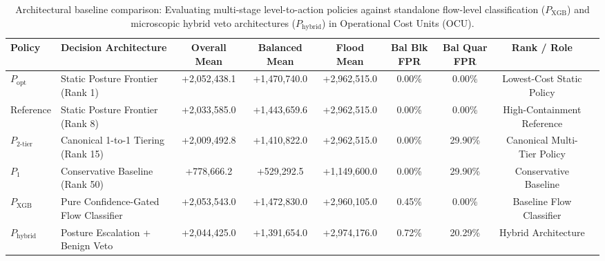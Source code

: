 \documentclass[journal,10pt,onecolumn]{IEEEtran}
\begin{document}
\begin{table}[t]
\caption{Architectural baseline comparison: Evaluating multi-stage level-to-action policies against standalone flow-level classification ($P_{\text{XGB}}$) and microscopic hybrid veto architectures ($P_{\text{hybrid}}$) in Operational Cost Units (OCU).}
\label{tab:architectural_baselines}
\centering
\small
\begin{tabular}{llccccccc}
\toprule
\textbf{Policy} & \textbf{Decision Architecture} & \textbf{Overall Mean} & \textbf{Balanced Mean} & \textbf{Flood Mean} & \textbf{Bal Blk FPR} & \textbf{Bal Quar FPR} & \textbf{Rank / Role} \\
\midrule
$P_{\text{opt}}$ & Static Posture Frontier (Rank 1) & +2,052,438.1 & +1,470,740.0 & +2,962,515.0 & 0.00\% & 0.00\% & Lowest-Cost Static Policy \\
Reference & Static Posture Frontier (Rank 8) & +2,033,585.0 & +1,443,659.6 & +2,962,515.0 & 0.00\% & 0.00\% & High-Containment Reference \\
$P_{2\text{-tier}}$ & Canonical 1-to-1 Tiering (Rank 15) & +2,009,492.8 & +1,410,822.0 & +2,962,515.0 & 0.00\% & 29.90\% & Canonical Multi-Tier Policy \\
$P_1$ & Conservative Baseline (Rank 50) & +778,666.2 & +529,292.5 & +1,149,600.0 & 0.00\% & 29.90\% & Conservative Baseline \\
$P_{\text{XGB}}$ & Pure Confidence-Gated Flow Classifier & +2,053,543.0 & +1,472,830.0 & +2,960,105.0 & 0.45\% & 0.00\% & Baseline Flow Classifier \\
$P_{\text{hybrid}}$ & Posture Escalation + Benign Veto & +2,044,425.0 & +1,391,654.0 & +2,974,176.0 & 0.72\% & 20.29\% & Hybrid Architecture \\
\bottomrule
\end{tabular}
\end{table}
\end{document}
